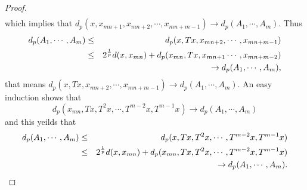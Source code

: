 \documentclass[10pt,a4paper]{amsart}
\begin{document}
\begin{proof}
\begin{eqnarray*}
\end{eqnarray*}
which implies that $d_p(x,x_{mn+1},x_{mn+2},\cdots,x_{mn+m-1})\to d_p(A_1,\cdots,A_m)$.
Thus
\begin{eqnarray*}
d_p(A_1,\cdots,A_m)&\leq& d_p(x,Tx,x_{mn+2},\cdots,x_{mn+m-1})\\
&\leq&2^{1\over p}d(x,x_{mn})+d_p(x_{mn},Tx,x_{mn+1}\cdots,x_{mn+m-2})\\&&\to d_p(A_1,\cdots,A_m),
\end{eqnarray*}
that means $ d_p(x,Tx,x_{mn+2},\cdots,x_{mn+m-1})\to d_p(A_1,\cdots,A_m).$ An easy induction shows that $$d_p(x_{mn},Tx,T^2x,\cdots,T^{m-2}x,T^{m-1}x)\to d_p(A_1,\cdots,A_m)$$
and this yeilds that
\begin{eqnarray*}
d_p(A_1,\cdots,A_m)&\leq&d_p(x,Tx,T^2x,\cdots,T^{m-2}x,T^{m-1}x)\\
&\leq&2^{1\over p}d(x,x_{mn})+d_p(x_{mn},Tx,T^2x,\cdots,T^{m-2}x,T^{m-1}x)\\&&\to d_p(A_1,\cdots,A_m).
\end{eqnarray*}
\end{proof}
\end{document}
